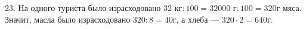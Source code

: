 23. На одного туриста было израсходовано $32\text{ кг}:100=32000\text{ г}:100=320$г мяса. Значит, масла было израсходовано $320:8=40$г, а хлеба --- $320\cdot2=640$г.\\
